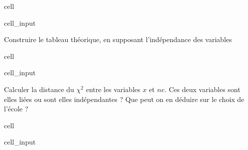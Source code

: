 \documentclass[letterpaper,10pt,french]{sphinxmanual}
\begin{document}
\begin{sphinxuseclass}{cell}
\begin{sphinxuseclass}{cell_input}
\begin{sphinxVerbatim}[commandchars=\\\{\}]
\end{sphinxVerbatim}

\end{sphinxuseclass}
\end{sphinxuseclass}
\sphinxAtStartPar
Construire le tableau théorique, en supposant l’indépendance des variables

\begin{sphinxuseclass}{cell}
\begin{sphinxuseclass}{cell_input}
\begin{sphinxVerbatim}[commandchars=\\\{\}]
\end{sphinxVerbatim}

\end{sphinxuseclass}
\end{sphinxuseclass}
\sphinxAtStartPar
Calculer la distance du \(\chi^2\) entre les variables \(x\) et \(ne\). Ces deux variables sont elles liées ou sont elles indépendantes ? Que peut on en déduire sur le choix de l’école ?

\begin{sphinxuseclass}{cell}
\begin{sphinxuseclass}{cell_input}
\begin{sphinxVerbatim}[commandchars=\\\{\}]
\end{sphinxVerbatim}

\end{sphinxuseclass}
\end{sphinxuseclass}
\sphinxstepscope
\end{document}
